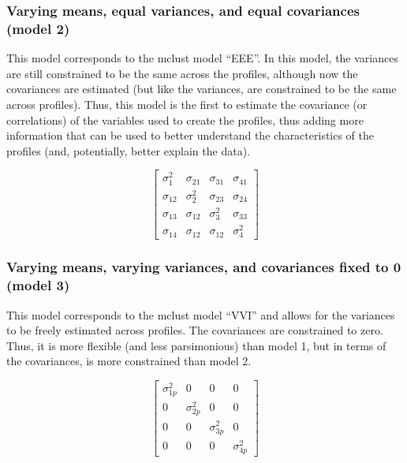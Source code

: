 \documentclass[]{book}
\theoremstyle{definition}
\theoremstyle{definition}
\theoremstyle{definition}
\theoremstyle{remark}
\begin{document}
\subsubsection{Varying means, equal variances, and equal covariances
(model
2)}\label{varying-means-equal-variances-and-equal-covariances-model-2}

This model corresponds to the mclust model ``EEE''. In this model, the
variances are still constrained to be the same across the profiles,
although now the covariances are estimated (but like the variances, are
constrained to be the same across profiles). Thus, this model is the
first to estimate the covariance (or correlations) of the variables used
to create the profiles, thus adding more information that can be used to
better understand the characteristics of the profiles (and, potentially,
better explain the data).

\[
\left[ \begin{matrix} { \sigma  }_{ 1 }^{ 2 } & { \sigma  }_{ 21 } & { \sigma  }_{ 31 } & { \sigma  }_{ 41 } \\ { \sigma  }_{ 12 } & { \sigma  }_{ 2 }^{ 2 } & { \sigma  }_{ 23 } & { \sigma  }_{ 24 } \\ { \sigma  }_{ 13 } & { \sigma  }_{ 12 } & { \sigma  }_{ 3 }^{ 2 } & { \sigma  }_{ 33 } \\ { \sigma  }_{ 14 } & { \sigma  }_{ 12 } & { \sigma  }_{ 12 } & { \sigma  }_{ 4 }^{ 2 } \end{matrix} \right] 
\]

\subsubsection{Varying means, varying variances, and covariances fixed
to 0 (model
3)}\label{varying-means-varying-variances-and-covariances-fixed-to-0-model-3}

This model corresponds to the mclust model ``VVI'' and allows for the
variances to be freely estimated across profiles. The covariances are
constrained to zero. Thus, it is more flexible (and less parsimonious)
than model 1, but in terms of the covariances, is more constrained than
model 2.

\[ 
\left[ \begin{matrix} { \sigma  }_{ 1p }^{ 2 } & 0 & 0 & 0 \\ 0 & { \sigma  }_{ 2p }^{ 2 } & 0 & 0 \\ 0 & 0 & { \sigma  }_{ 3p }^{ 2 } & 0 \\ 0 & 0 & 0 & { \sigma  }_{ 4p }^{ 2 } \end{matrix} \right] 
\]
\end{document}
